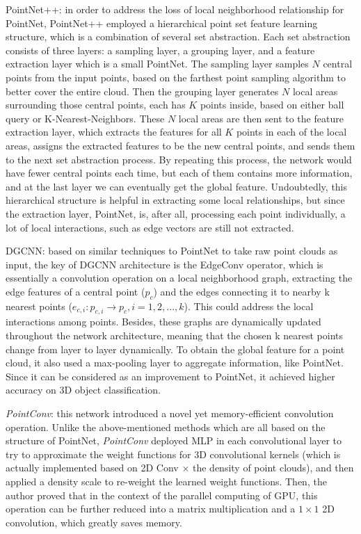 \documentclass{article}
\begin{document}
PointNet++\cite{pointnetpp}: in order to address the loss of local neighborhood relationship for PointNet, PointNet++ employed a hierarchical point set feature learning structure, which is a combination of several set abstraction. Each set abstraction consists of three layers: a sampling layer, a grouping layer, and a feature extraction layer which is a small PointNet. The sampling layer samples $N$ central points from the input points, based on the farthest point sampling algorithm to better cover the entire cloud. Then the grouping layer generates $N$ local areas surrounding those central points, each has $K$ points inside, based on either ball query or K-Nearest-Neighbors. These $N$ local areas are then sent to the feature extraction layer, which extracts the features for all $K$ points in each of the local areas, assigns the extracted features to be the new central points, and sends them to the next set abstraction process. By repeating this process, the network would have fewer central points each time, but each of them contains more information, and at the last layer we can eventually get the global feature. Undoubtedly, this hierarchical structure is helpful in extracting some local relationships, but since the extraction layer, PointNet, is, after all, processing each point individually, a lot of local interactions, such as edge vectors are still not extracted.

DGCNN\cite{dgcnn}: based on similar techniques to PointNet to take raw point clouds as input, the key of DGCNN architecture is the EdgeConv operator, which is essentially a convolution operation on a local neighborhood graph, extracting the edge features of a central point ($p_c$) and the edges connecting it to nearby k nearest points ($e_{c, i}: p_{c,i} \rightarrow p_{c}, i=1,2,...,k$). This could address the local interactions among points. Besides, these graphs are dynamically updated throughout the network architecture, meaning that the chosen k nearest points change from layer to layer dynamically. To obtain the global feature for a point cloud, it also used a max-pooling layer to aggregate information, like PointNet. Since it can be considered as an improvement to PointNet, it achieved higher accuracy on 3D object classification.

\textit{PointConv}\cite{pointconv}: this network introduced a novel yet memory-efficient convolution operation. Unlike the above-mentioned methods which are all based on the structure of PointNet, \textit{PointConv} deployed MLP in each convolutional layer to try to approximate the weight functions for 3D convolutional kernels (which is actually implemented based on 2D Conv $\times$ the density of point clouds), and then applied a density scale to re-weight the learned weight functions. Then, the author proved that in the context of the parallel computing of GPU, this operation can be further reduced into a matrix multiplication and a $1 \times 1$ 2D convolution, which greatly saves memory.
\end{document}
